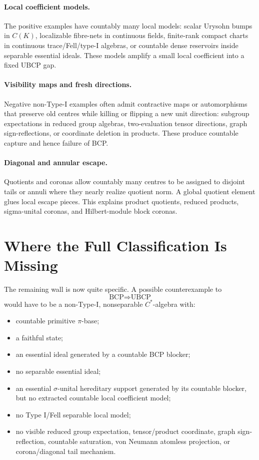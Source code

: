 \documentclass[11pt]{article}
\begin{document}
\paragraph{Local coefficient models.}
The positive examples have countably many local models: scalar Urysohn bumps
in \(C(K)\), localizable fibre-nets in continuous fields, finite-rank compact
charts in continuous trace/Fell/type-I algebras, or countable dense reservoirs
inside separable essential ideals.  These models amplify a small local
coefficient into a fixed UBCP gap.

\paragraph{Visibility maps and fresh directions.}
Negative non-Type-I examples often admit contractive maps or automorphisms
that preserve old centres while killing or flipping a new unit direction:
subgroup expectations in reduced group algebras, two-evaluation tensor
directions, graph sign-reflections, or coordinate deletion in products.
These produce countable capture and hence failure of BCP.

\paragraph{Diagonal and annular escape.}
Quotients and coronas allow countably many centres to be assigned to disjoint
tails or annuli where they nearly realize quotient norm.  A global quotient
element glues local escape pieces.  This explains product quotients, reduced
products, sigma-unital coronas, and Hilbert-module block coronas.

\section*{Where the Full Classification Is Missing}

The remaining wall is now quite specific.  A possible counterexample to
\[
        \text{BCP}\Rightarrow\text{UBCP}
\]
would have to be a non-Type-I, nonseparable \(C^*\)-algebra with:

\begin{itemize}
\item countable primitive \(\pi\)-base;
\item a faithful state;
\item an essential ideal generated by a countable BCP blocker;
\item no separable essential ideal;
\item an essential \(\sigma\)-unital hereditary support generated by its
countable blocker, but no extracted countable local coefficient model;
\item no Type I/Fell separable local model;
\item no visible reduced group expectation, tensor/product coordinate,
graph sign-reflection, countable saturation, von Neumann atomless projection,
or corona/diagonal tail mechanism.
\end{itemize}
\end{document}
